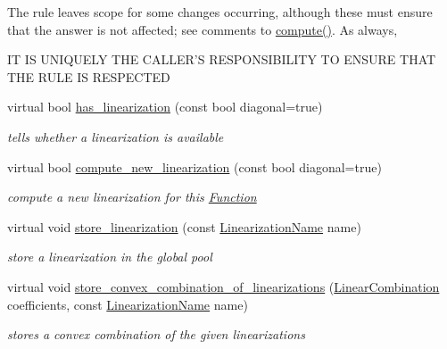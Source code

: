\begin{Indent}
{The rule leaves scope for some changes occurring, although these must ensure that the answer is not affected; see comments to \mbox{\hyperlink{class_s_m_spp__di__unipi__it_1_1_function_a504d4e3e174c7a518cc66156a8a45ce5}{compute()}}. As always, \begin{DoxyVerb}          IT IS UNIQUELY THE CALLER'S RESPONSIBILITY
            TO ENSURE THAT THE RULE IS RESPECTED\end{DoxyVerb}
 }\begin{DoxyCompactItemize}
\item 
virtual bool \mbox{\hyperlink{class_s_m_spp__di__unipi__it_1_1_c05_function_a5f49301b93b1980e945001a23d3ce2a9}{has\+\_\+linearization}} (const bool diagonal=true)
\begin{DoxyCompactList}\small\item\em tells whether a linearization is available \end{DoxyCompactList}\item 
virtual bool \mbox{\hyperlink{class_s_m_spp__di__unipi__it_1_1_c05_function_a9a77f2430dcf732f6d6d9fd50d923baf}{compute\+\_\+new\+\_\+linearization}} (const bool diagonal=true)
\begin{DoxyCompactList}\small\item\em compute a new linearization for this \mbox{\hyperlink{class_s_m_spp__di__unipi__it_1_1_function}{Function}} \end{DoxyCompactList}\item 
virtual void \mbox{\hyperlink{class_s_m_spp__di__unipi__it_1_1_c05_function_ac477d0c3276fa28127d5aff69f31c367}{store\+\_\+linearization}} (const \mbox{\hyperlink{class_s_m_spp__di__unipi__it_1_1_c05_function_ae90bf93c6d4b4ada66791c735d1c03cc}{Linearization\+Name}} name)
\begin{DoxyCompactList}\small\item\em store a linearization in the global pool \end{DoxyCompactList}\item 
virtual void \mbox{\hyperlink{class_s_m_spp__di__unipi__it_1_1_c05_function_aa711d56d6e59b22f499eb0486df87699}{store\+\_\+convex\+\_\+combination\+\_\+of\+\_\+linearizations}} (\mbox{\hyperlink{class_s_m_spp__di__unipi__it_1_1_c05_function_a70544540af2063e1072dfaed40270109}{Linear\+Combination}} coefficients, const \mbox{\hyperlink{class_s_m_spp__di__unipi__it_1_1_c05_function_ae90bf93c6d4b4ada66791c735d1c03cc}{Linearization\+Name}} name)
\begin{DoxyCompactList}\small\item\em stores a convex combination of the given linearizations \end{DoxyCompactList}\item 

\end{DoxyCompactItemize}
\end{Indent}
